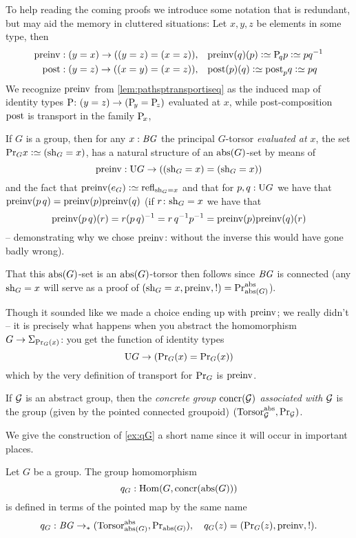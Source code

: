 To help reading the coming proofs we introduce some notation that is redundant, but may aid the memory in cluttered situations:  Let $x,y,z$ be elements in some type, then
\begin{align*}
  \preinv:(y=x)\to ((y=z)=(x=z)),\quad&\preinv(q)(p)\defequi\pathsp qp\defequi pq^{-1}\\
  \post:(y=z)\to ((x=y)=(x=z)),\quad&\post(p)(q)\defequi\post_pq\defequi pq\\
\end{align*}
We recognize $\mathrm{preinv}$ from \cref{lem:pathsptransportiseq} as the induced map of identity types $\mathrm{P}_{\!}\colon (y=z)\to(\mathrm{P}_{\!y}=\mathrm{P}_{\!z})$ evaluated at $x$, while post-composition $\mathrm{post}$ is transport in the family $\mathrm{P}_{\!x}$, 


\begin{example}\label{ex:qG}
  If $G$ is a group, then for any $x:\mathit{B}\mathit{G}$ the principal $G$-torsor \emph{evaluated at $x$}, \ie the set $\princ Gx\defequi(\sh_G=x)$, has a natural structure of an $\mathrm{abs}(G)$-set by means of 
$$\mathrm{preinv}:\mathrm{U} G\to ((\mathrm{sh}_G=x)=(\mathrm{sh}_G=x))$$ and the fact that $\preinv(e_G)\defequi\refl{\sh_G=x}$ and that for $p,q:\mathrm{U} G$ we have that  $\mathrm{preinv}(p\,q)=\mathrm{preinv}(p)\mathrm{preinv}(q)$ (\ie if $r\colon \mathrm{sh}_G=x$ we have that 
$$\mathrm{preinv}(p\, q)(r)=r(p\,q)^{-1}=r\,q^{-1}p^{-1}=\mathrm{preinv}(p)\mathrm{preinv}(q)(r)$$  -- demonstrating why we chose $\mathrm{preinv}$: without the inverse this would have gone badly wrong).  

That this $\mathrm{abs}(G)$-set is an $\mathrm{abs}(G)$-torsor then follows since $\mathit{B}\mathit{G}$ is connected (any $\mathrm{sh}_G=x$ will serve as a proof of $(\mathrm{sh}_G=x,\mathrm{preinv},!)=\mathrm{Pr}_{{\mathrm{abs}(G)}}^{\mathrm{abs}}$).

Though it sounded like we made a choice ending up with $\mathrm{preinv}$; we really didn't -- it is precisely what happens when you abstract the homomorphism $G\to\Sigma_{\mathrm{Pr}_{{G}}(x)}$: 
you get the function of identity types 
$$\mathrm{U} G\to (\mathrm{Pr}_{{G}}(x)=\mathrm{Pr}_{{G}}(x))$$ 
which by the very definition of transport for $\mathrm{Pr}_{{G}}$ is $\mathrm{preinv}$. 
\end{example}

\begin{definition}
  If ${\mathcal G}$ is an abstract group, then the \emph{concrete group $\mathrm{concr}({\mathcal G})$ associated with ${\mathcal G}$} is the group (given by the pointed connected groupoid) $(\mathrm{Torsor}_{\mathcal G}^{\mathrm{abs}},\mathrm{Pr}_{{\mathcal G}})$.
\end{definition}
We give the construction of \cref{ex:qG} a short name since it will occur in important places.
\begin{definition}
  Let $G$ be a group.
  The group homomorphism 
  $$q_G:\Hom(G,\concr(\abstr(G)))$$
  is defined in terms of the pointed map by the same name
$$q_G:\mathit{B}\mathit{G}\to_* (\mathrm{Torsor}^{\mathrm{abs}}_{\mathrm{abs}(G)},\mathrm{Pr}_{{\mathrm{abs}(G)}}),\quad q_G(z)=(\mathrm{Pr}_{{G}}(z),\mathrm{preinv},!).$$
\end{definition}

